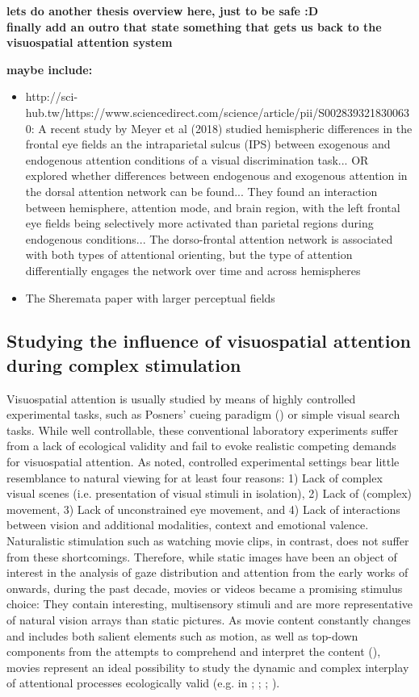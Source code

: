 \documentclass[a4paper, 12pt]{scrreprt}
\begin{document}
\textbf{lets do another thesis overview here, just to be safe :D} \\
\textbf{finally add an outro that state something that gets us back to the visuospatial attention system}

\textbf{maybe include:}
\begin{itemize}
	\item http://sci-hub.tw/https://www.sciencedirect.com/science/article/pii/S0028393218300630: A recent study by Meyer et al (2018) studied hemispheric differences in the frontal eye fields an the intraparietal sulcus (IPS) between exogenous and endogenous attention conditions of a visual discrimination task... OR explored whether differences between endogenous and exogenous attention in the dorsal attention network can be found... They found an interaction between hemisphere, attention mode, and brain region, with the left frontal eye fields being selectively more activated than parietal regions during endogenous conditions... The dorso-frontal attention network is associated with both types of attentional orienting, but the type of attention differentially engages the network over time and across hemispheres
	\item The Sheremata paper with larger perceptual fields
\end{itemize}


\subsection{Studying the influence of visuospatial attention during complex stimulation }
Visuospatial attention is usually studied by means of highly controlled experimental tasks, such as Posners' cueing paradigm (\cite{posner1980attention}) or simple visual search tasks. While well controllable, these conventional laboratory experiments suffer from a lack of ecological validity and fail to evoke realistic competing demands for visuospatial attention. As \textcite{hasson2004intersubject} noted, controlled experimental settings bear little resemblance to natural viewing for at least four reasons: 1) Lack of complex visual scenes (i.e. presentation of visual stimuli in isolation), 2) Lack of (complex) movement, 3) Lack of unconstrained eye movement, and 4) Lack of interactions between vision and additional modalities, context and emotional valence. Naturalistic stimulation such as watching movie clips, in contrast, does not suffer from these shortcomings. Therefore, while static images have been an object of interest in the analysis of gaze distribution and attention from the early works of \textcite{yarbus1967eye} onwards, during the past decade, movies or videos became a promising stimulus choice: They contain interesting, multisensory stimuli and are more representative of natural vision arrays than static pictures. As movie content constantly changes and includes both salient elements such as motion, as well as top-down components from the attempts to comprehend and interpret the content (\cite{ross2013eye}), movies represent an ideal possibility to study the dynamic and complex interplay of attentional processes ecologically valid (e.g. in \textcite{hasson2004intersubject}; \cite{carmi2006visual}; \cite{tseng2009quantifying}; \cite{dorr2010variability}).
\end{document}
